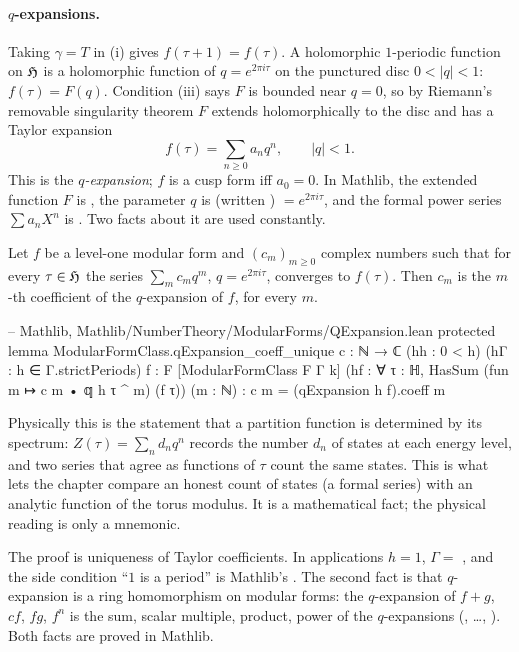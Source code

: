 \paragraph{$q$-expansions.}
Taking $\gamma = T$ in (i) gives $f(\tau+1) = f(\tau)$. A holomorphic $1$-periodic function on
$\mathfrak{H}$ is a holomorphic function of $q = e^{2\pi i\tau}$ on the punctured disc $0<|q|<1$:
$f(\tau) = F(q)$. Condition (iii) says $F$ is bounded near $q = 0$, so by Riemann's removable
singularity theorem $F$ extends holomorphically to the disc and has a Taylor expansion
\begin{equation}\label{ch05:eq:qexp}
  f(\tau) = \sum_{n\ge 0} a_n q^n, \qquad |q|<1 .
\end{equation}
This is the \emph{$q$-expansion}; $f$ is a cusp form iff $a_0 = 0$. In Mathlib, the extended
function $F$ is , the parameter $q$ is 
(written ) $= e^{2\pi i\tau}$, and the formal power series $\sum a_nX^n$ is
. Two facts about it are used constantly.

\begin{proposition}\label{ch05:prop:qunique}
Let $f$ be a level-one modular form and $(c_m)_{m\ge0}$ complex numbers such that for every
$\tau\in\mathfrak{H}$ the series $\sum_m c_m q^m$, $q = e^{2\pi i\tau}$, converges to $f(\tau)$. Then $c_m$
is the $m$-th coefficient of the $q$-expansion of $f$, for every $m$.
\end{proposition}
\begin{plaincode}
-- Mathlib, Mathlib/NumberTheory/ModularForms/QExpansion.lean
protected lemma ModularFormClass.qExpansion_coeff_unique {c : ℕ → ℂ} (hh : 0 < h)
    (hΓ : h ∈ Γ.strictPeriods) {f : F} [ModularFormClass F Γ k]
    (hf : ∀ τ : ℍ, HasSum (fun m ↦ c m • 𝕢 h τ ^ m) (f τ)) (m : ℕ) :
    c m = (qExpansion h f).coeff m
\end{plaincode}

\begin{physics}
Physically this is the statement that a partition function is determined by its spectrum: $Z(\tau)=\sum_n d_n q^{n}$ records the number $d_n$ of states at each energy level, and two series that agree as functions of $\tau$ count the same states. This is what lets the chapter compare an honest count of states (a formal series) with an analytic function of the torus modulus. It is a mathematical fact; the physical reading is only a mnemonic.
\end{physics}
The proof is uniqueness of Taylor coefficients. In applications $h = 1$, $\Gamma = $ , and
the side condition ``$1$ is a period'' is Mathlib's . The second
fact is that $q$-expansion is a ring homomorphism on modular forms: the $q$-expansion of $f+g$,
$cf$, $fg$, $f^n$ is the sum, scalar multiple, product, power of the $q$-expansions
(, \dots, ). Both facts are
proved in Mathlib.

